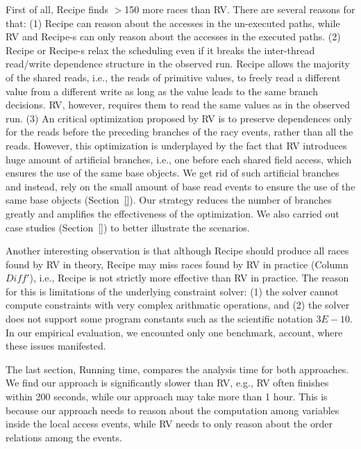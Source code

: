 First of all, {\sf Recipe} finds $>$150 more races than {\sf RV}. There are several reasons for that: (1) {\sf Recipe} can reason about the accesses in the un-executed paths, while {\sf RV} and {\sf Recipe-s} can only reason about the accesses in the executed paths. (2) {\sf Recipe} or {\sf Recipe-s} relax the scheduling even if it breaks the inter-thread read/write dependence structure in the observed run. {\sf Recipe} allows the majority of the shared reads, i.e., the reads of primitive values, to freely read a different value from a different write as long as the value leads to the same branch decisions. {\sf RV}, however, requires them to read the same values as in the observed run. (3) An critical optimization proposed by {\sf RV} is to preserve dependences only for the reads before the preceding branches  of the racy events, rather than all the reads. However, this optimization is underplayed by the fact that {\sf RV} introduces huge amount of artificial branches, i.e., one before each shared field access, which ensures the use of the same base objects.
We get rid of such artificial branches and instead, rely on the small amount of base read events to ensure the use of the same base objects (Section~\ref{}). Our strategy reduces the number of branches greatly and amplifies the effectiveness of the optimization. We also carried out case studies (Section~\ref{}) to better illustrate the scenarios.

 

Another interesting observation is that although {\sf Recipe} should produce all races found by {\sf RV} in theory, {\sf Recipe} may miss races found by {\sf RV} in practice (Column $Diff'$), i.e., {\sf Recipe} is not strictly more effective than {\sf RV} in practice. The reason for this is limitations of the underlying constraint solver: (1) the solver cannot compute constraints with very complex arithmatic operations, and (2) the solver does not support some program constants such as the scientific notation $3E-10$. In our empirical evaluation, we encounted only one benchmark, account, where these issues manifested.

The last section, Running time, compares the analysis time for both approaches. We find our approach is significantly slower than {\sf RV}, e.g., {\sf RV} often finishes within 200 seconds, while our approach may take more than 1 hour. This is because our approach needs to reason about the computation among variables inside the local access events, while {\sf RV} needs to only reason about the order relations among the events.


